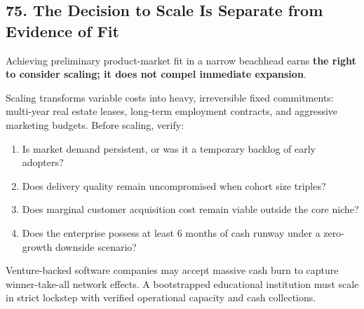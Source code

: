 \subsection*{75. The Decision to Scale Is Separate from Evidence of Fit}

Achieving preliminary product-market fit in a narrow beachhead earns \textbf{the right to consider scaling; it does not compel immediate expansion}.

Scaling transforms variable costs into heavy, irreversible fixed commitments: multi-year real estate leases, long-term employment contracts, and aggressive marketing budgets. Before scaling, verify:
\begin{enumerate}
    \item Is market demand persistent, or was it a temporary backlog of early adopters?
    \item Does delivery quality remain uncompromised when cohort size triples?
    \item Does marginal customer acquisition cost remain viable outside the core niche?
    \item Does the enterprise possess at least 6 months of cash runway under a zero-growth downside scenario?
\end{enumerate}

Venture-backed software companies may accept massive cash burn to capture winner-take-all network effects. A bootstrapped educational institution must scale in strict lockstep with verified operational capacity and cash collections.
